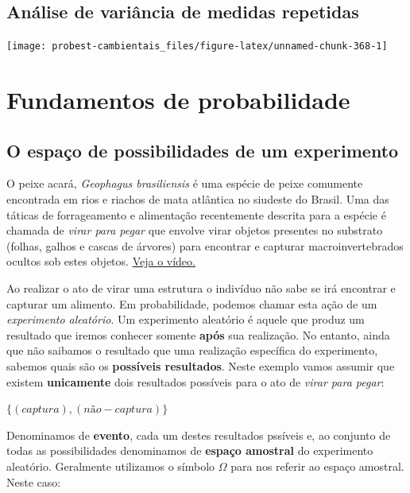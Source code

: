 \documentclass[
]{book}
\begin{document}
\hypertarget{repanova}{%
\chapter{Análise de variância de medidas repetidas}\label{repanova}}

\begin{center}\texttt{[image: probest-cambientais\_files/figure-latex/unnamed-chunk-368-1]} \end{center}

\hypertarget{part-fundamentos-de-probabilidade}{%
\part{Fundamentos de probabilidade}\label{part-fundamentos-de-probabilidade}}

\hypertarget{espacoamostral}{%
\chapter{O espaço de possibilidades de um experimento}\label{espacoamostral}}

O peixe acará, \emph{Geophagus brasiliensis} é uma espécie de peixe comumente encontrada em rios e riachos de mata atlântica no siudeste do Brasil. Uma das táticas de forrageamento e alimentação recentemente descrita para a espécie é chamada de \emph{virar para pegar} \citep{souza2019surprising} que envolve virar objetos presentes no substrato (folhas, galhos e cascas de árvores) para encontrar e capturar macroinvertebrados ocultos sob estes objetos. \href{https://www.scielo.br/img/revistas/bn/v19n3/1676-0611-bn-19-03-e20180702-suppl1.mp4}{Veja o vídeo.}

Ao realizar o ato de virar uma estrutura o indivíduo não sabe se irá encontrar e capturar um alimento. Em probabilidade, podemos chamar esta ação de um \emph{experimento aleatório}. Um experimento aleatório é aquele que produz um resultado que iremos conhecer somente \textbf{após} sua realização. No entanto, ainda que não saibamos o resultado que uma realização específica do experimento, sabemos quais são os \textbf{possíveis resultados}. Neste exemplo vamos assumir que existem \textbf{unicamente} dois resultados possíveis para o ato de \emph{virar para pegar}:

\(\{(captura), (não-captura)\}\)

Denominamos de \textbf{evento}, cada um destes resultados pssíveis e, ao conjunto de todas as possibilidades denominamos de \textbf{espaço amostral} do experimento aleatório. Geralmente utilizamos o símbolo \(\Omega\) para nos referir ao espaço amostral. Neste caso:
\end{document}
